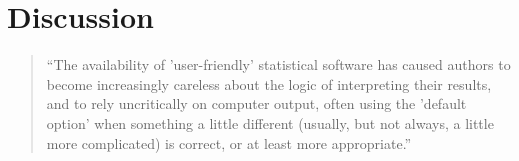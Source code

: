\documentclass{article} %
\def\ie{i.e.\ }
\def\eg{e.g.\ }
\begin{document}





\section{Discussion}

\begin{quotation}
``The availability of 'user-friendly' statistical software has caused authors to become increasingly careless about the logic of interpreting their results, and to rely uncritically on computer output, often using the 'default option' when something a little different (usually, but not always, a little more complicated) is correct, or at least more appropriate.''

\hspace*{\fill}
\end{quotation}
\end{document}
